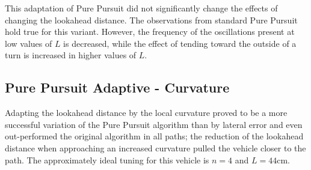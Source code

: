 \documentclass[mla8alt]{mla}
\begin{document}
\begin{paper}
\begin{figure}[H]
\endminipage
\end{figure}

This adaptation of Pure Pursuit did not significantly change the effects of changing the lookahead distance. The observations from standard Pure Pursuit hold true for this variant. However, the frequency of the oscillations present at low values of $L$ is decreased, while the effect of tending toward the outside of a turn is increased in higher values of $L$.

\subsection{Pure Pursuit Adaptive - Curvature}

Adapting the lookahead distance by the local curvature proved to be a more successful variation of the Pure Pursuit algorithm than by lateral error and even out-performed the original algorithm in all paths; the reduction of the lookahead distance when approaching an increased curvature pulled the vehicle closer to the path. The approximately ideal tuning for this vehicle is $n=4$ and $L=44$cm.


\end{paper}
\end{document}
